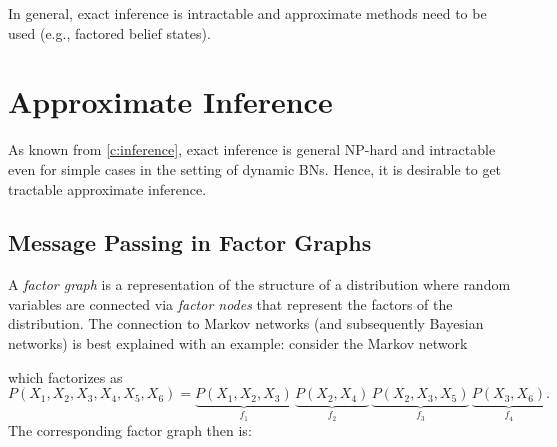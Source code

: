 		In general, exact inference is intractable and approximate methods need to be used (e.g., factored belief states).


\chapter{Approximate Inference}
	\label{c:approxInference}

	As known from \autoref{c:inference}, exact inference is general NP-hard and intractable even for simple cases in the setting of dynamic BNs. Hence, it is desirable to get tractable approximate inference.

	\section{Message Passing in Factor Graphs}
		A \emph{factor graph} is a representation of the structure of a distribution where random variables are connected via \emph{factor nodes} that represent the factors of the distribution. The connection to Markov networks (and subsequently Bayesian networks) is best explained with an example: consider the Markov network
		\begin{center}
		\end{center}
		which factorizes as
		\begin{equation}
			P(X_1, X_2, X_3, X_4, X_5, X_6) = \underbrace{P(X_1, X_2, X_3)}_{f_1} \, \underbrace{P(X_2, X_4)}_{f_2} \, \underbrace{P(X_2, X_3, X_5)}_{f_3} \, \underbrace{P(X_3, X_6)}_{f_4}.
		\end{equation}
		The corresponding factor graph then is:
